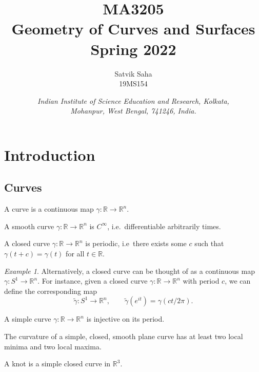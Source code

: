 \documentclass[11pt]{article}
\title{
    \Large\textsc{MA3205} \\
    \Huge \textbf{Geometry of Curves and Surfaces} \\
    \vspace{5pt}
    \Large{Spring 2022}
}
\author{
    \large Satvik Saha
    \\\textsc{\small 19MS154}
}
\date{\normalsize
    \textit{Indian Institute of Science Education and Research, Kolkata, \\
    Mohanpur, West Bengal, 741246, India.} \\
}
\newcommand{\R}{\mathbb{R}}
\theoremstyle{definition}
\theoremstyle{remark}
\newtheorem*{example}{Example}
\numberwithin{equation}{section}
\begin{document}
    \maketitle

    \tableofcontents
    
    \section{Introduction}
    
    \subsection{Curves}
    
    \begin{definition}
        A curve is a continuous map $\gamma\colon \R \to \R^n$.
    \end{definition}

    \begin{definition}
        A smooth curve $\gamma\colon \R \to \R^n$ is $C^\infty$, i.e.\ differentiable
        arbitrarily times.
    \end{definition}

    \begin{definition}
        A closed curve $\gamma\colon \R \to \R^n$ is periodic, i.e\ there exists some
        $c$ such that $\gamma(t + c) = \gamma(t)$ for all $t \in \R$.
    \end{definition}
    \begin{example}
        Alternatively, a closed curve can be thought of as a continuous map
        $\gamma\colon S^1 \to \R^n$. For instance, given a closed curve $\gamma\colon
        \R \to \R^n$ with period $c$, we can define the corresponding map \[
            \tilde{\gamma}\colon S^1 \to \R^n, \qquad \tilde{\gamma}(e^{it}) =
            \gamma(ct / 2\pi).
        \] 
    \end{example}

    \begin{definition}
        A simple curve $\gamma\colon \R \to \R^n$ is injective on its period.
    \end{definition}

    \begin{theorem}
        The curvature of a simple, closed, smooth plane curve has at least two local
        minima and two local maxima.
    \end{theorem}


    \begin{definition}
        A knot is a simple closed curve in $\R^3$.
    \end{definition}
\end{document}
